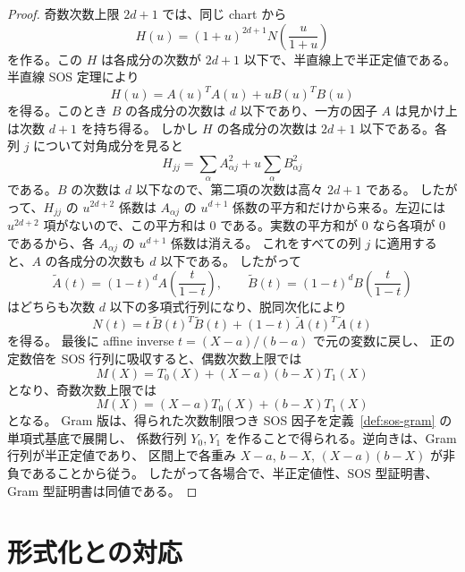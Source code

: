 \documentclass[uplatex,dvipdfmx]{jsarticle}
\theoremstyle{matrixsosdefinition}
\begin{document}
\begin{proof}
  奇数次数上限 \(2d+1\) では、同じ chart から
  \[
    H(u)=(1+u)^{2d+1}N\!\left(\frac{u}{1+u}\right)
  \]
  を作る。この \(H\) は各成分の次数が \(2d+1\) 以下で、半直線上で半正定値である。
  半直線 SOS 定理により
  \[
    H(u)=A(u)^TA(u)+uB(u)^TB(u)
  \]
  を得る。このとき \(B\) の各成分の次数は \(d\) 以下であり、一方の因子
  \(A\) は見かけ上は次数 \(d+1\) を持ち得る。
  しかし \(H\) の各成分の次数は \(2d+1\) 以下である。各列 \(j\) について対角成分を見ると
  \[
    H_{jj}=\sum_\alpha A_{\alpha j}^2
      +u\sum_\alpha B_{\alpha j}^2
  \]
  である。\(B\) の次数は \(d\) 以下なので、第二項の次数は高々 \(2d+1\) である。
  したがって、\(H_{jj}\) の \(u^{2d+2}\) 係数は
  \(A_{\alpha j}\) の \(u^{d+1}\) 係数の平方和だけから来る。左辺には
  \(u^{2d+2}\) 項がないので、この平方和は 0 である。実数の平方和が 0 なら各項が
  0 であるから、各 \(A_{\alpha j}\) の \(u^{d+1}\) 係数は消える。
  これをすべての列 \(j\) に適用すると、\(A\) の各成分の次数も \(d\) 以下である。
  したがって
  \[
    \widetilde A(t)=(1-t)^d A\!\left(\frac{t}{1-t}\right),\qquad
    \widetilde B(t)=(1-t)^d B\!\left(\frac{t}{1-t}\right)
  \]
  はどちらも次数 \(d\) 以下の多項式行列になり、脱同次化により
    \[
      N(t)=t\,\widetilde B(t)^T\widetilde B(t)
        +(1-t)\,\widetilde A(t)^T\widetilde A(t)
    \]
    を得る。
    最後に affine inverse \(t=(X-a)/(b-a)\) で元の変数に戻し、
正の定数倍を SOS 行列に吸収すると、偶数次数上限では
\[
  M(X)=T_0(X)+(X-a)(b-X)T_1(X)
\]
となり、奇数次数上限では
\[
  M(X)=(X-a)T_0(X)+(b-X)T_1(X)
\]
となる。
Gram 版は、得られた次数制限つき SOS 因子を定義~\ref{def:sos-gram} の単項式基底で展開し、
係数行列 \(Y_0,Y_1\) を作ることで得られる。逆向きは、Gram 行列が半正定値であり、
区間上で各重み \(X-a\), \(b-X\), \((X-a)(b-X)\) が非負であることから従う。
したがって各場合で、半正定値性、SOS 型証明書、Gram 型証明書は同値である。
\end{proof}

\appendix

\section{形式化との対応}
\end{document}
